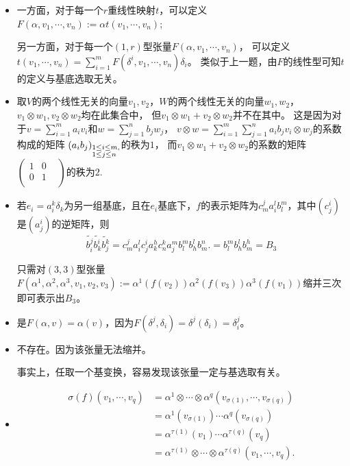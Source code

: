 \begin{itemize}
    \item[18.]
    一方面，对于每一个$r$重线性映射$t$，可以定义$ F(\alpha, v_1, \cdots, v_n) := \alpha t(v_1, \cdots, v_n)$;

    另一方面，对于每一个$(1,r)$型张量$ F(\alpha, v_1, \cdots, v_n)$，
    可以定义$t(v_1, \cdots, v_n) = \sum\limits_{i=1}^{m} F(\delta^i, v_1, \cdots, v_n)\delta_i$。
    类似于上一题，由$F$的线性型可知$t$的定义与基底选取无关。

    \item[20.]
    取$V$的两个线性无关的向量$v_1,v_2$，$W$的两个线性无关的向量$w_1,w_2$，
    $v_1\otimes w_1, v_2\otimes w_2$均在此集合中，
    但$v_1\otimes w_1+v_2\otimes w_2$并不在其中。
    这是因为对于$v=\sum\limits_{i=1}^m a_iv_i$和$w=\sum\limits_{j=1}^n b_jw_j$，
    $v\otimes w=\sum\limits_{i=1}^m\sum\limits_{j=1}^n a_ib_jv_i\otimes w_j$的系数构成的矩阵
    $(a_ib_j)_{\begin{subarray}{l}1\leq i\leq m,\\1\leq j\leq n\end{subarray}}$的秩为$1$，
    而$v_1\otimes w_1+v_2\otimes w_2$的系数的矩阵
    $\left(\begin{matrix}1&0& \\0&1& \\ & & \end{matrix}\right)$的秩为$2$.

    \item[21.]
    若$e_i = a^k_i \delta_k$为另一组基底，且在${e_i}$基底下，$f$的表示矩阵为$c^j_m a^l_ib^m_l$，其中$(c^i_j)$是$(a^i_j)$的逆矩阵，则
    $$
    \tilde{b^j_i} \tilde{b^i_k} \tilde{b^k_j} = c^j_m a^l_i c^i_j a^h_k c^k_n a^m_j b^m_l b^l_h b^n_m.
    = b^m_l b^l_h b^h_m = B_3
    $$

    只需对$(3,3)$型张量$F(\alpha^1,\alpha^2,\alpha^3,v_1,v_2,v_3) := 
    \alpha^1(f(v_2))\alpha^2(f(v_3))\alpha^3(f(v_1)) $缩并三次即可表示出$B_3$。

    \item[22.]
    是$F(\alpha,v) = \alpha(v)$，因为$F(\delta^j,\delta_i) = \delta^j(\delta_i)=\delta_i^j$。

    \item[23.]
    不存在。因为该张量无法缩并。

    事实上，任取一个基变换，容易发现该张量一定与基选取有关。

    \item[24.]
    \begin{equation*}
        \begin{aligned}
            \sigma(f)(v_1,\cdots,v_q) &= \alpha^1 \otimes \cdots \otimes \alpha^q (v_{\sigma(1)},\cdots,v_{\sigma(q)})\\
            &= \alpha^1(v_{\sigma(1)})\cdots \alpha^q(v_{\sigma(q)})\\
            &= \alpha^{\tau(1)}(v_{1})\cdots \alpha^{\tau(q)}(v_{q})\\
            &= \alpha^{\tau(1)}\otimes\cdots\otimes\alpha^{\tau(q)}(v_1,\cdots,v_q).
        \end{aligned}
    \end{equation*}
	

\end{itemize}
